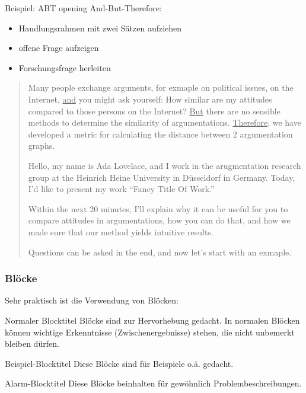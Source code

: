 \begin{frame}{Beispiel: ABT opening}
    And-But-Therefore:
    \begin{itemize}
        \item Handlungsrahmen mit zwei Sätzen aufziehen
        \item offene Frage aufzeigen
        \item Forschungsfrage herleiten
    \end{itemize}
\small
    \begin{quotation}
Many people exchange arguments, for exmaple on political issues, on the Internet, \underline{and} you might ask yourself: How similar are my attitudes compared to those persons on the Internet? \underline{But} there are no sensible methods to determine the similarity of argumentations. \underline{Therefore}, we have developed a metric for calculating the distance between 2 argumentation graphs.

Hello, my name is Ada Lovelace, and I work in the arugmentation research group at the Heinrich Heine University in Düsseldorf in Germany. Today, I'd like to present my work “Fancy Title Of Work.”

Within the next 20 minutes, I'll explain why it can be useful for you to compare attitudes in argumentations, how you can do that, and how we made sure that our method yields intuitive results.

Questions can be asked in the end, and now let's start with an exmaple.
    \end{quotation}
\end{frame}

\begin{frame}
  \frametitle{Blöcke}

  Sehr praktisch ist die Verwendung von Blöcken:
  \begin{block}{Normaler Blocktitel}
    Blöcke sind zur Hervorhebung gedacht. In normalen Blöcken können
    wichtige Erkenntnisse (Zwischenergebnisse) stehen, die nicht
    unbemerkt bleiben dürfen.
  \end{block}

  \begin{exampleblock}{Beispiel-Blocktitel}
    Diese Blöcke sind für Beispiele o.ä. gedacht.
  \end{exampleblock}

  \begin{alertblock}{Alarm-Blocktitel}
    Diese Blöcke beinhalten für gewöhnlich Problembeschreibungen.
  \end{alertblock}
\end{frame}

